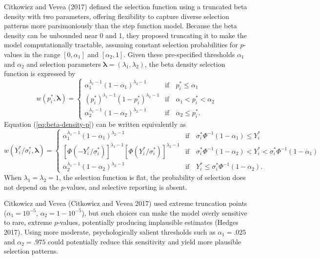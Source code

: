 \documentclass[
]{article}
\begin{document}
Citkowicz and Vevea (2017) defined the selection function using a
truncated beta density with two parameters, offering flexibility to
capture diverse selection patterns more parsimoniously than the step
function model. Because the beta density can be unbounded near 0 and 1,
they proposed truncating it to make the model computationally tractable,
assuming constant selection probabilities for \(p\)-values in the range
\([0, \alpha_1]\) and \([\alpha_2, 1]\). Given these pre-specified
thresholds \(\alpha_1\) and \(\alpha_2\) and selection parameters
\(\boldsymbol\lambda = (\lambda_1, \lambda_2)\), the beta density
selection function is expressed by \begin{equation}
\label{eq:beta-density-p}
w(p^*_i, \boldsymbol\lambda) =  \begin{cases} 
\alpha_1^{\lambda_1 - 1} (1 - \alpha_1)^{\lambda_2 - 1} & \text{if} \quad p^*_i \leq \alpha_1 \\
\left(p^*_i\right)^{\lambda_1 - 1} (1 - p^*_i)^{\lambda_2 - 1} & \text{if} \quad \alpha_1 < p^*_i < \alpha_2 \\
\alpha_2^{\lambda_1 - 1} (1 - \alpha_2)^{\lambda_2 - 1} & \text{if} \quad \alpha_2 \leq p^*_i.
\end{cases}
\end{equation} Equation (\ref{eq:beta-density-p}) can be written
equivalently as \begin{equation}
\label{eq:beta-density-y}
w(Y^*_i / \sigma^*_i, \boldsymbol\lambda) =  \begin{cases} 
\alpha_1^{\lambda_1 - 1} (1 - \alpha_1)^{\lambda_2 - 1} & \text{if} \quad \sigma^*_i \Phi^{-1}(1 - \alpha_1) \leq Y^*_i \\
\left[\Phi\left(-Y^*_i / \sigma^*_i\right)\right]^{\lambda_1 - 1} \left[\Phi\left(Y^*_i / \sigma^*_i\right)\right]^{\lambda_2 - 1} & \text{if} \quad \sigma^*_i \Phi^{-1}(1 - \alpha_2) < Y^*_i < \sigma^*_i \Phi^{-1}(1 - \alpha_1) \\
\alpha_2^{\lambda_1 - 1} (1 - \alpha_2)^{\lambda_2 - 1} & \text{if} \quad  Y^*_i \leq \sigma^*_i \Phi^{-1}(1 - \alpha_2).
\end{cases}
\end{equation} When \(\lambda_1 = \lambda_2 = 1\), the selection
function is flat, the probability of selection does not depend on the
\(p\)-values, and selective reporting is absent.

Citkowicz and Vevea (Citkowicz and Vevea 2017) used extreme truncation
points (\(\alpha_1 = 10^{-5}\), \(\alpha_2 = 1 - 10^{-5}\)), but such
choices can make the model overly sensitive to rare, extreme
\(p\)-values, potentially producing implausible estimates (Hedges 2017).
Using more moderate, psychologically salient thresholds such as
\(\alpha_1 = .025\) and \(\alpha_2 = .975\) could potentially reduce
this sensitivity and yield more plausible selection patterns.
\end{document}
